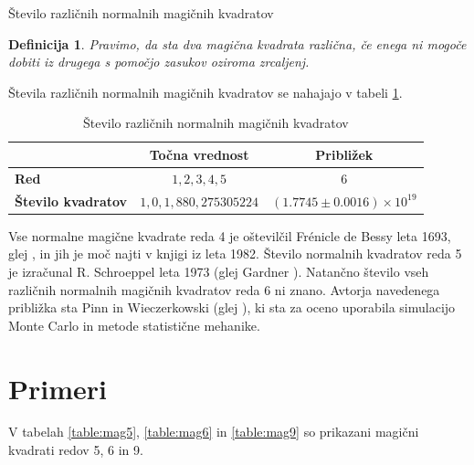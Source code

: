 \documentclass[a4paper,12pt]{article}
\newtheorem{definition}{Definicija}
\begin{document}
Število različnih normalnih magičnih kvadratov

\begin{definition}
      Pravimo, da sta dva magična kvadrata \emph{različna}, če enega ni mogoče dobiti
      iz drugega s pomočjo zasukov oziroma zrcaljenj.
\end{definition}

Števila različnih normalnih magičnih kvadratov se nahajajo v tabeli \ref{stevila}.

\begin{table}[h!]
    \centering
    \caption{Število različnih normalnih magičnih kvadratov}
    \label{stevila}
    \begin{tabular}{lcc}
        \hline
        \textbf{} & \textbf{Točna vrednost} & \textbf{Približek} \\ \hline
        \textbf{Red} & $1, 2, 3, 4, 5$ & $6$ \\ 
        \textbf{Število kvadratov} & $1, 0, 1, 880, 275305224$ & $(1.7745 \pm 0.0016) \times 10^{19}$ \\ \hline
    \end{tabular}
\end{table}

Vse normalne magične kvadrate reda 4 je oštevilčil Frénicle de Bessy
leta 1693, glej \label{bessy}, in jih je moč najti v knjigi \label{berlekamp}
iz leta 1982. Število normalnih kvadratov reda 5 je izračunal
R. Schroeppel leta 1973 (glej Gardner \label{gardner}).
Natančno število vseh različnih normalnih magičnih kvadratov reda 6 ni znano.
Avtorja navedenega približka sta Pinn in Wieczerkowski (glej \label{pinn}), ki
sta za oceno uporabila simulacijo Monte Carlo in metode statistične mehanike.


\section{Primeri}

V tabelah \ref{table:mag5}, \ref{table:mag6} in \ref{table:mag9} so prikazani
magični kvadrati redov 5, 6 in 9.
\end{document}
